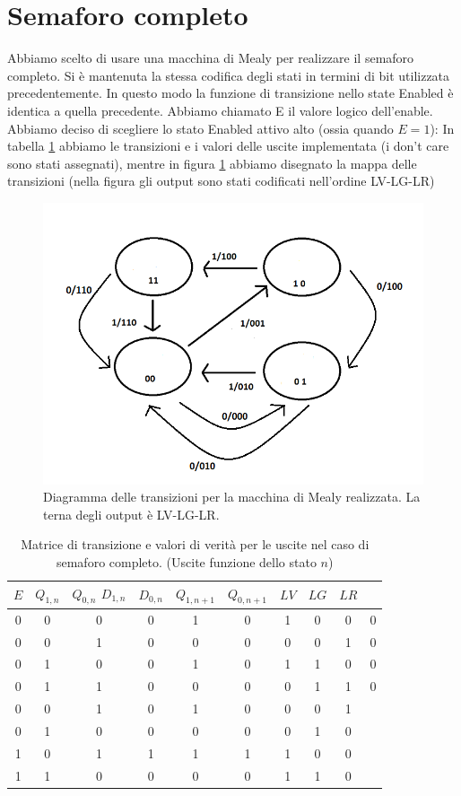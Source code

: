 \documentclass[10pt,a4paper]{article}
\begin{document}
\section{Semaforo completo}
Abbiamo scelto di usare una macchina di Mealy per realizzare il semaforo completo. Si è mantenuta la stessa codifica degli stati in termini di bit utilizzata precedentemente. In questo modo la funzione di transizione nello state Enabled è identica a quella precedente. Abbiamo chiamato E il valore logico dell'enable.
Abbiamo deciso di scegliere lo stato Enabled attivo alto (ossia quando $E = 1$):%
In tabella \ref{tab:semaforocompleto} abbiamo le transizioni e i valori delle uscite implementata (i don't care sono stati assegnati), mentre in figura \ref{fig:FSMcomplete} abbiamo disegnato la mappa delle transizioni (nella figura gli output sono stati codificati nell'ordine LV-LG-LR)
\begin{figure}[!htb]
\centering
\includegraphics[scale=0.7]{FSMcomplete.png}
\caption{Diagramma delle transizioni per la macchina di Mealy realizzata. La terna degli output è LV-LG-LR.\label{fig:FSMcomplete}}
\end{figure}
\begin{table}
\centering
\begin{tabular}{|c||c|c|c|c||c|c||c|c|c|}
\hline
$E$ & $Q_{1,n}$ & $Q_{0, n}$ $D_{1,n}$ & $D_{0,n}$ & $Q_{1, n+1}$ & $Q_{0, n+1}$ & $LV$ & $LG$ & $LR$\\
\hline
0 & 0 & 0 & 0 & 1 & 0 & 1 & 0 & 0 & 0 \\
0 & 0 & 1 & 0 & 0 & 0 & 0 & 0 & 1 & 0\\
0 & 1 & 0 & 0 & 1 & 0 & 1 & 1 & 0 & 0\\
0 & 1 & 1 & 0 & 0 & 0 & 0 & 1 & 1 & 0\\
\hline
0 & 0 & 1 & 0 & 1 & 0 & 0 & 0 & 1 \\
0 & 1 & 0 & 0 & 0 & 0 & 0 & 1 & 0\\
1 & 0 & 1 & 1 & 1 & 1 & 1 & 0 & 0\\
1 & 1 & 0 & 0 & 0 & 0 & 1 & 1 & 0\\
\hline
\end{tabular}
\caption{Matrice di transizione e valori di verità per le uscite nel caso di semaforo completo. (Uscite funzione dello stato $n$) \label{tab:semaforocompleto}}
\end{table} 
\end{document}
